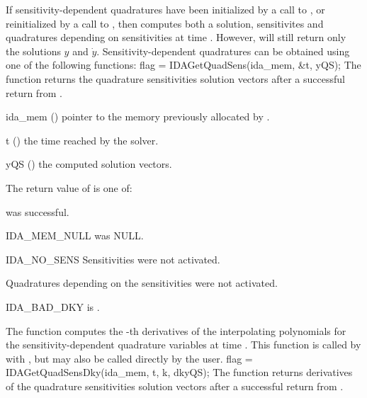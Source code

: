 If sensitivity-dependent quadratures have been initialized by a call to ,
or reinitialized by a call to , then {\idas} computes both a solution,
sensitivites and quadratures depending on sensitivities at time . However, 
 will still return only the solutions $y$ and $\dot{y}$. Sensitivity-dependent 
quadratures can be obtained using one of the following functions:
{
  flag = IDAGetQuadSens(ida\_mem, \&t, yQS);
}
{
  The function  returns the quadrature sensitivities
  solution vectors after a successful return from .
}
{
  \begin{args}
  \item[ida\_mem] ()
    pointer to the memory previously allocated by .
  \item[t] ()
    the time reached by the solver.
  \item[yQS] ()
    the computed solution vectors.
  \end{args}
}
{
  The return value  of  is one of:
  \begin{args}
  \item[\Id{IDA\_SUCCESS}] 
     was successful.
  \item[IDA\_MEM\_NULL] 
     was NULL.
  \item[IDA\_NO\_SENS]
    Sensitivities were not activated.
  \item[\Id{IDA\_NO\_QUADSENS}] 
    Quadratures depending on the sensitivities were not activated.
  \item[IDA\_BAD\_DKY] 
     is .
  \end{args}
}
{}
The function  computes the -th derivatives of the interpolating 
polynomials for the sensitivity-dependent quadrature variables at time .
This function is called by  with , but may also be called 
directly by the user.
{
  flag = IDAGetQuadSensDky(ida\_mem, t, k, dkyQS);
}
{
  The function  returns derivatives of the quadrature sensitivities 
  solution vectors after a successful return from .
}

